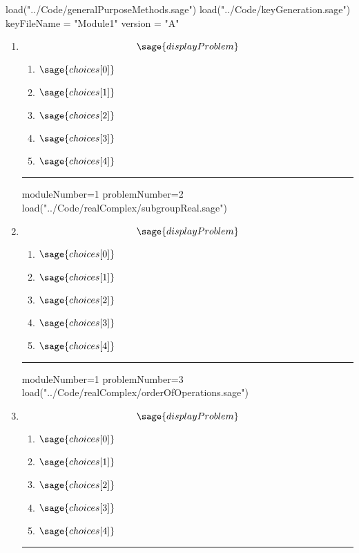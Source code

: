 \documentclass[14pt]{article}
\newcommand{\litem}[1]{\item#1\hspace*{-1cm}\rule{\textwidth}{0.4pt}}
\begin{document}
\pagestyle{fancy}

\begin{sagesilent}
load("../Code/generalPurposeMethods.sage")
load("../Code/keyGeneration.sage")
keyFileName = "Module1"
version = "A"
\end{sagesilent}

\begin{enumerate}
\setcounter{enumi}{0}


\begin{sagesilent}
moduleNumber=1
problemNumber=1
load("../Code/realComplex/divideComplex.sage")
\end{sagesilent}

\litem{ 

	\[ \sage{displayProblem} \]

	\begin{enumerate}[label=\Alph*.]
    \item \( \sage{choices[0]} \)
    \item \( \sage{choices[1]} \)
    \item \( \sage{choices[2]} \)
    \item \( \sage{choices[3]} \)
    \item \( \sage{choices[4]} \)
	\end{enumerate}
}

\begin{sagesilent}
moduleNumber=1
problemNumber=2
load("../Code/realComplex/subgroupReal.sage")
\end{sagesilent}
\litem{ 
\[ \sage{displayProblem} \]

	\begin{enumerate}[label=\Alph*.]
    \item \( \sage{choices[0]} \)
    \item \( \sage{choices[1]} \)
    \item \( \sage{choices[2]} \)
    \item \( \sage{choices[3]} \)
    \item \( \sage{choices[4]} \)
	\end{enumerate} }


\begin{sagesilent}
moduleNumber=1
problemNumber=3
load("../Code/realComplex/orderOfOperations.sage")
\end{sagesilent}
\litem{ 

\[ \sage{displayProblem} \]

	\begin{enumerate}[label=\Alph*.]
		\item \( \sage{choices[0]} \)
		\item \( \sage{choices[1]} \)
		\item \( \sage{choices[2]} \)
		\item \( \sage{choices[3]} \)
		\item \( \sage{choices[4]} \)
	\end{enumerate} }


\end{enumerate}
\end{document}
